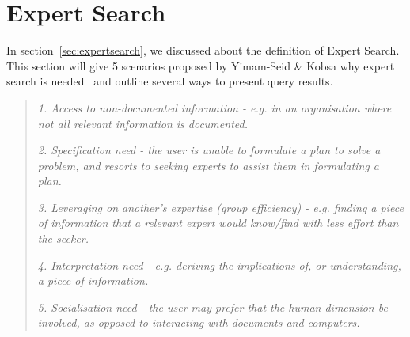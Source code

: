 \section{Expert Search}
In section~\ref{sec:expertsearch}, we discussed about the definition of Expert Search. This section will give 5 scenarios proposed by Yimam-Seid \& Kobsa
why expert search is needed~\cite[P. 387]{expertsearch} and outline several ways to present query results.
\begin{quotation}
  \item \textit{1. Access to non-documented information - e.g. in an organisation where not all relevant information is documented.}
  \item \textit{2. Specification need - the user is unable to formulate a plan to solve a problem, and resorts to seeking experts to assist them in formulating a plan.}
  \item \textit{3. Leveraging on another's expertise (group efficiency) - e.g. finding a piece of information that a relevant expert would know/find with
  less effort than the seeker.}
  \item \textit{4. Interpretation need - e.g. deriving the implications of, or understanding, a piece of information.}
  \item \textit{5. Socialisation need - the user may prefer that the human dimension be involved, as opposed to interacting with documents and computers.}
\end{quotation}

